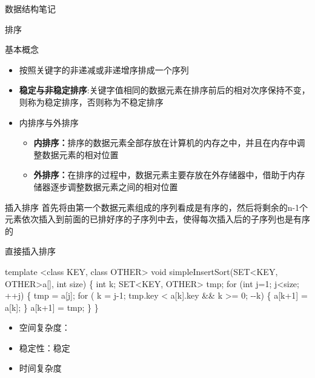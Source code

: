 \documentclass[
  ignorenonframetext,
]{beamer}
\newenvironment{Shaded}{}{}
\newcommand{\NormalTok}[1]{#1}
\providecommand{\tightlist}{%
  \setlength{\itemsep}{0pt}\setlength{\parskip}{0pt}}
\begin{document}
\begin{frame}[fragile]{数据结构笔记}
\begin{block}{排序}
\protect{}\label{ux6392ux5e8f}
\begin{block}{基本概念}
\protect{}\label{ux57faux672cux6982ux5ff5-1}
\begin{itemize}
\tightlist
\item
  按照关键字的非递减或非递增序排成一个序列
\item
  \textbf{稳定与非稳定排序}:关键字值相同的数据元素在排序前后的相对次序保持不变，则称为稳定排序，否则称为不稳定排序
\item
  内排序与外排序

  \begin{itemize}
  \tightlist
  \item
    \textbf{内排序：}排序的数据元素全部存放在计算机的内存之中，并且在内存中调整数据元素的相对位置
  \item
    \textbf{外排序：}在排序的过程中，数据元素主要存放在外存储器中，借助于内存储器逐步调整数据元素之间的相对位置
  \end{itemize}
\end{itemize}
\end{block}

\begin{block}{插入排序}
\protect{}\label{ux63d2ux5165ux6392ux5e8f}
首先将由第一个数据元素组成的序列看成是有序的，然后将剩余的n-1个元素依次插入到前面的已排好序的子序列中去，使得每次插入后的子序列也是有序的

\begin{block}{直接插入排序}
\protect{}\label{ux76f4ux63a5ux63d2ux5165ux6392ux5e8f}
\begin{Shaded}
\begin{Highlighting}[]
\NormalTok{template \textless{}class KEY, class OTHER\textgreater{}}
\NormalTok{void simpleInsertSort(SET\textless{}KEY, OTHER\textgreater{}a[], int size)}
\NormalTok{\{}
\NormalTok{  int k;}
\NormalTok{  SET\textless{}KEY, OTHER\textgreater{} tmp;}
\NormalTok{  for (int j=1; j\textless{}size; ++j)}
\NormalTok{  \{}
\NormalTok{  tmp = a[j];}
\NormalTok{  for ( k = j{-}1; tmp.key \textless{} a[k].key \&\& k \textgreater{}= 0; {-}{-}k)}
\NormalTok{  \{}
\NormalTok{    a[k+1] = a[k];}
\NormalTok{  \}}
\NormalTok{  a[k+1] = tmp;}
\NormalTok{  \}}
\NormalTok{\}}
\end{Highlighting}
\end{Shaded}

\begin{itemize}
\tightlist
\item
  空间复杂度：{}
\item
  稳定性：稳定
\item
  时间复杂度


\end{itemize}
\end{block}
\end{block}
\end{block}
\end{frame}
\end{document}
